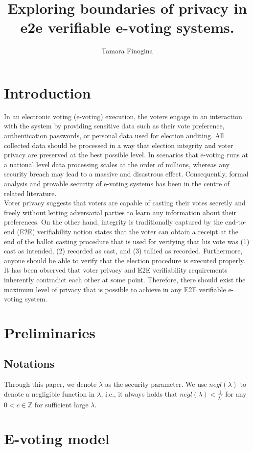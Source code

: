 \documentclass[12pt]{article}
\author{Tamara Finogina}
\title{Exploring boundaries of privacy in e2e verifiable e-voting systems.}
\date{}
\begin{document}
\maketitle
\section{Introduction}
In an electronic voting (e-voting) execution, the voters engage in an interaction with the system by providing sensitive data such as their vote preference, authentication passwords, or personal data used for election auditing. All collected data should be processed in a way that election integrity and voter privacy are preserved at the best possible level. In scenarios that e-voting runs at a national level data processing scales at the order of millions, whereas any security breach may lead to a massive and disastrous effect. Consequently, formal analysis and provable security of e-voting systems has been in the centre of related literature.\\

Voter privacy suggests that voters are capable of casting their votes secretly and freely without letting adversarial parties to learn any information about their preferences. On the other hand, integrity is traditionally captured by the end-to-end (E2E) verifiability notion states that the voter can obtain a receipt at the end of the ballot casting procedure that is used for verifying that his vote was (1) cast as intended, (2) recorded as cast, and (3) tallied as recorded. Furthermore, anyone should be able to verify that the election procedure is executed properly. It has been observed that voter privacy and E2E verifiability requirements inherently contradict each other at some point.  Therefore, there should exist the maximum level of privacy that is possible to achieve in any E2E verifiable e-voting system.
\section{Preliminaries} 
\subsection{Notations}
Through this paper, we denote $\lambda$ as the security parameter. We use $negl(\lambda)$ to denote a negligible function in $\lambda$, i.e., it always holds that $negl(\lambda) < \frac{1}{\lambda^c}$ for any $0<c \in \mathbb{Z}$ for sufficient large $\lambda$. 
\section{E-voting model}
\end{document}
